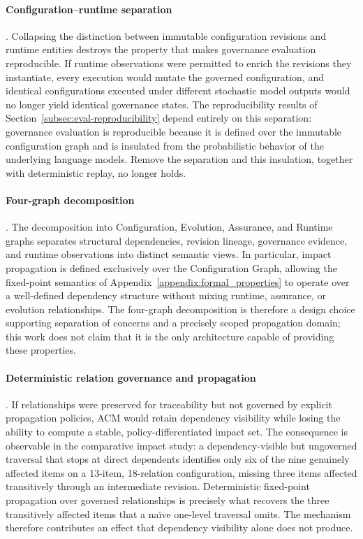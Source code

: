 \documentclass[10pt]{article}
\begin{document}
\paragraph{Configuration–runtime separation}. Collapsing the distinction between immutable configuration revisions and runtime entities destroys the property that makes governance evaluation reproducible. If runtime observations were permitted to enrich the revisions they instantiate, every execution would mutate the governed configuration, and identical configurations executed under different stochastic model outputs would no longer yield identical governance states. The reproducibility results of Section~\ref{subsec:eval-reproducibility} depend entirely on this separation: governance evaluation is reproducible because it is defined over the immutable configuration graph and is insulated from the probabilistic behavior of the underlying language models. Remove the separation and this insulation, together with deterministic replay, no longer holds.

\paragraph{Four-graph decomposition}. The decomposition into Configuration, Evolution, Assurance, and Runtime graphs separates structural dependencies, revision lineage, governance evidence, and runtime observations into distinct semantic views. In particular, impact propagation is defined exclusively over the Configuration Graph, allowing the fixed-point semantics of Appendix~\ref{appendix:formal_properties} to operate over a well-defined dependency structure without mixing runtime, assurance, or evolution relationships. The four-graph decomposition is therefore a design choice supporting separation of concerns and a precisely scoped propagation domain; this work does not claim that it is the only architecture capable of providing these properties.

\paragraph{Deterministic relation governance and propagation}. If relationships were preserved for traceability but not governed by explicit propagation policies, ACM would retain dependency visibility while losing the ability to compute a stable, policy-differentiated impact set. The consequence is observable in the comparative impact study: a dependency-visible but ungoverned traversal that stops at direct dependents identifies only six of the nine genuinely affected items on a 13-item, 18-relation configuration, missing three items affected transitively through an intermediate revision. Deterministic fixed-point propagation over governed relationships is precisely what recovers the three transitively affected items that a naïve one-level traversal omits. The mechanism therefore contributes an effect that dependency visibility alone does not produce.
\end{document}
